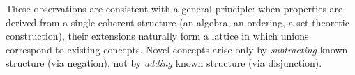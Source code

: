 These observations are consistent with a general principle: when properties are derived from a single coherent structure (an algebra, an ordering, a set-theoretic construction), their extensions naturally form a lattice in which unions correspond to existing concepts. Novel concepts arise only by \emph{subtracting} known structure (via negation), not by \emph{adding} known structure (via disjunction).
